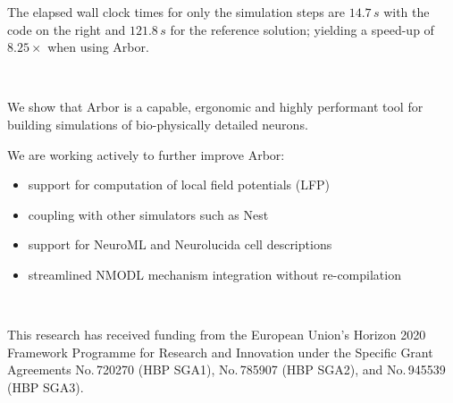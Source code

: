 \documentclass{beamer}
\begin{document}
\begin{frame}[t, fragile]
\begin{columns}[T]
\begin{column}{.49\linewidth}
      The elapsed wall clock times for only the simulation steps are $14.7\,s$
      with the code on the right and $121.8\,s$ for the reference solution;
      yielding a speed-up of $8.25\times$ when using Arbor.
    \end{column}
    \begin{column}{.49\linewidth}
      \inputminted[bgcolor=lightgray,escapeinside=!!]{python}{src/model.py}
    \end{column}
  \end{columns}
  \begin{columns}[T]
    \begin{column}{.49\linewidth}
      \textbf{}\\
      We show that Arbor is a capable, ergonomic and highly
      performant tool for building simulations of bio-physically detailed
      neurons.

      We are working actively to further improve Arbor:
      \begin{itemize}
        \item support for computation of local field potentials (LFP)
        \item coupling with other simulators such as Nest
        \item support for NeuroML and Neurolucida cell descriptions
        \item streamlined NMODL mechanism integration without re-compilation
      \end{itemize}
    \end{column}
    \begin{column}{.49\linewidth}
      \textbf{}\\
      \printbibliography{}
    \end{column}
  \end{columns}

      \textbf{}\\
      This research has received funding from the European Union's Horizon 2020
      Framework Programme for Research and Innovation under the Specific Grant
      Agreements No.\,720270 (HBP SGA1), No.\,785907 (HBP SGA2), and No.\,945539
      (HBP SGA3).\\[1.5ex]
\end{frame}
\end{document}
